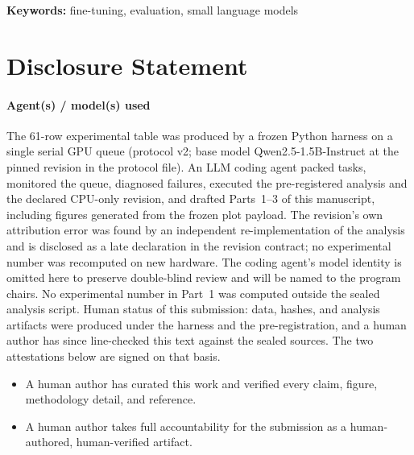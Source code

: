 \documentclass{article}
\begin{document}
\noindent\textbf{Keywords:} fine-tuning, evaluation, small language models


\clearpage

\clearpage


\clearpage
\nocite{gsm8k,winogrande,spider,math,mbpp,drop,tydiqa,arc,hellaswag,piqa}

\section{Disclosure Statement}

\paragraph{Agent(s) / model(s) used}
The 61-row experimental table was produced by a frozen Python
harness on a single serial GPU queue (protocol v2; base model
Qwen2.5-1.5B-Instruct at the pinned revision in the protocol
file). An LLM coding agent packed tasks, monitored the queue,
diagnosed failures, executed the pre-registered analysis and the
declared CPU-only revision, and drafted Parts~1--3 of this
manuscript, including figures generated from the frozen plot
payload. The revision's own attribution error was found by an
independent re-implementation of the analysis and is disclosed as
a late declaration in the revision contract; no experimental
number was recomputed on new hardware. The coding agent's model identity is
omitted here to preserve double-blind review and will be named to
the program chairs. No experimental number in Part~1 was computed
outside the sealed analysis script.
Human status of this submission: data, hashes, and analysis
artifacts were produced under the harness and the
pre-registration, and a human author has since line-checked this
text against the sealed sources. The two attestations below are
signed on that basis.

\begin{itemize}
  \item[$\boxtimes$] A human author has curated this work and verified every claim,
    figure, methodology detail, and reference.
  \item[$\boxtimes$] A human author takes full accountability for the submission as
    a human-authored, human-verified artifact.
\end{itemize}




\clearpage

\end{document}
